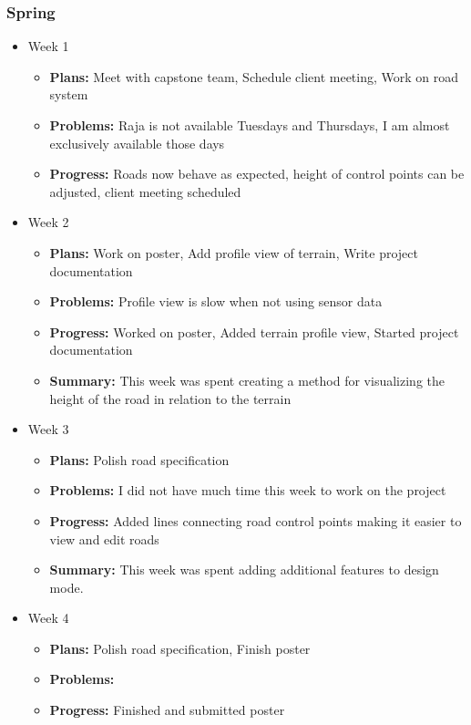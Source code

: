 \documentclass[onecolumn, draftclsnofoot,10pt, compsoc]{IEEEtran}
\begin{document}
\subsubsection{Spring}
\begin{itemize}
\item Week 1
	\begin{itemize}
	\item \textbf{Plans:} Meet with capstone team, Schedule client meeting, Work on road system
    \item \textbf{Problems:} Raja is not available Tuesdays and Thursdays, I am almost exclusively available those days
    \item \textbf{Progress:} Roads now behave as expected, height of control points can be adjusted, client meeting scheduled
	\end{itemize}
\item Week 2
	\begin{itemize}
	\item \textbf{Plans:} Work on poster, Add profile view of terrain, Write project documentation
    \item \textbf{Problems:} Profile view is slow when not using sensor data
    \item \textbf{Progress:} Worked on poster, Added terrain profile view, Started project documentation
    \item \textbf{Summary:} This week was spent creating a method for visualizing the height of the road in relation to the terrain 
	\end{itemize}
\item Week 3
	\begin{itemize}
	\item \textbf{Plans:} Polish road specification
    \item \textbf{Problems:} I did not have much time this week to work on the project
    \item \textbf{Progress:} Added lines connecting road control points making it easier to view and edit roads
    \item \textbf{Summary:} This week was spent adding additional features to design mode.
	\end{itemize}
\item Week 4
	\begin{itemize}
	\item \textbf{Plans:} Polish road specification, Finish poster
    \item \textbf{Problems:} 
    \item \textbf{Progress:} Finished and submitted poster

\end{itemize}
\end{itemize}
\end{document}
